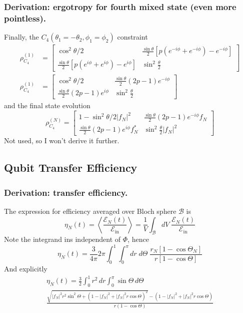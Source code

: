 \documentclass[../../../main.tex]{subfiles}
\begin{document}
\subsubsection{Derivation: ergotropy for fourth mixed state (even more pointless).}
Finally, the $C_4(\theta_1=-\theta_2,\phi_1=\phi_2)$ constraint
\begin{align*}
  \rho^{(1)}_{C_4}  & =
  \begin{bmatrix}
    \cos ^2 \theta/2                                                             & \frac{\sin \theta  }{2} \left[p(e^{-i\phi}+e^{-i\phi}) - e^{-i\phi}  \right] \\
    \frac{\sin \theta  }{2} \left[p(e^{i\phi} + e^{i\phi} ) - e^{i\phi}  \right] & \sin ^2 \frac{\theta  }{2}
  \end{bmatrix} \\
  \rho ^{(1)}_{C_4} & =
  \begin{bmatrix}
    \cos ^2 \theta/2                        & \frac{\sin \theta}{2}(2p-1) e^{-i\phi} \\
    \frac{\sin \theta  }{2} (2p-1)e^{i\phi} & \sin ^2 \frac{\theta  }{2}
  \end{bmatrix}
\end{align*}
and the final state evolution
\begin{equation*}
  \rho ^{(N)}_{C_4} =
  \begin{bmatrix}
    1- \sin^2 \theta/2|f_N|^2 & \frac{\sin \theta}{2}(2p-1) e^{-i\phi}f_N \\ \frac{\sin \theta  }{2} (2p-1)e^{i\phi}f_N ^*&  \sin ^2 \frac{\theta  }{2}|f_N|^2
  \end{bmatrix}
\end{equation*}
Not used, so I won't derive it further.

\subsection{Qubit Transfer Efficiency}
\subsubsection{Derivation: transfer efficiency.}
The expression for efficiency averaged over Bloch sphere $\mathcal{B}$ is
\begin{equation*}
  \eta_N(t)
  = \left\langle \frac{\mathcal E_N(t)}{\mathcal E_{\mathrm{in}}} \right\rangle
=\frac{1}{V}\int_{\mathcal B}dV\; \frac{\mathcal E_N(t)}{\mathcal E_{\mathrm{in}}}
\end{equation*}
Note the integrand ins independent of $\Phi$, hence
\begin{equation*}
    \eta_N(t) 
=\frac{3}{4\pi}2\pi \int_{0}^1\int_{0 }^{\pi}dr\;d\Theta\; \frac{r_N\left[1-\cos\Theta_N\right]}{r\left[1-\cos\Theta\right]}
\end{equation*}
And explicitly
\begin{multline*}
  \eta_N(t)
=\frac{3}{2}\int_0^1 r^2\,dr
\int_0^\pi \sin\Theta\,d\Theta\\
\frac{\sqrt{|f_N|^2r^2\sin^2\Theta+(1-|f_N|^2+|f_N|^2r\cos\Theta)^2}-(1-|f_N|^2+|f_N|^2r\cos\Theta)}{r(1-\cos\Theta)}
\end{multline*}
\end{document}
